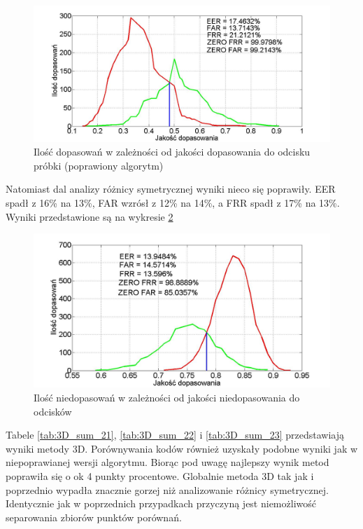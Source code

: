 \begin{figure}[!htb]
    \begin{center}
		\includegraphics[angle=0,scale=0.35]{img/sample_line_statistic_better_code.jpg}
		\caption{Ilość dopasowań w zależności od jakości dopasowania do odcisku próbki (poprawiony algorytm)}
		\label{img:sample_better_code}
    \end{center}
\end{figure} 

Natomiast dal analizy różnicy symetrycznej wyniki nieco się poprawiły. EER spadł z 16\% na 13\%, FAR wzrósł z 12\% na 14\%, a FRR spadł z 17\% na 13\%. Wyniki przedstawione są na wykresie \ref{img:simetric_better_code}
\begin{figure}[!htb]
    \begin{center}
		\includegraphics[angle=0,scale=0.4]{img/simetric_distance_better_code_line.jpg}
		\caption{Ilość niedopasowań w zależności od jakości niedopasowania do odcisków}
		\label{img:simetric_better_code}
    \end{center}
\end{figure} 

Tabele \ref{tab:3D_sum_21}, \ref{tab:3D_sum_22} i \ref{tab:3D_sum_23} przedstawiają wyniki metody 3D. Porównywania kodów również uzyskały podobne wyniki jak w niepoprawianej wersji algorytmu. Biorąc pod uwagę najlepszy wynik metod poprawiła się o ok 4 punkty procentowe. Globalnie metoda 3D tak jak i poprzednio wypadła znacznie gorzej niż analizowanie różnicy symetrycznej. Identycznie jak w poprzednich przypadkach przyczyną jest niemożliwość separowania zbiorów punktów porównań. 

